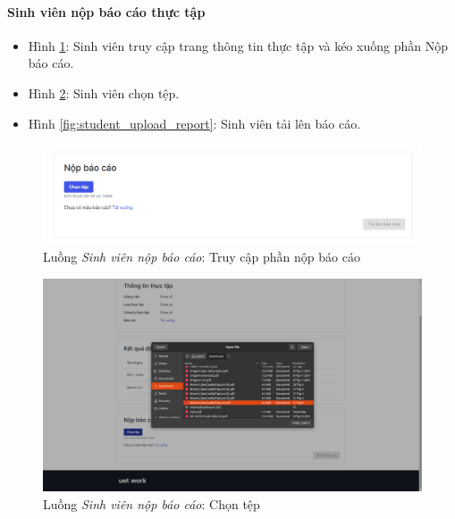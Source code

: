\documentclass[./../main.tex]{subfiles}
\begin{document}
\paragraph*{Sinh viên nộp báo cáo thực tập}

\begin{itemize}
	\item Hình \ref{fig:student_internship_info}: Sinh viên truy cập trang thông tin thực tập và kéo xuống phần Nộp báo cáo.
	\item Hình \ref{fig:student_choose_file}: Sinh viên chọn tệp.
	\item Hình \ref{fig:student_upload_report}: Sinh viên tải lên báo cáo.
\end{itemize}

\begin{figure}[]
	\includegraphics[width=\linewidth]{./images/image41.png}
	\caption{Luồng \emph{Sinh viên nộp báo cáo}: Truy cập phần nộp báo cáo}
	\label{fig:student_internship_info}
\end{figure}

\begin{figure}[]
	\includegraphics[width=\linewidth]{./images/image42.png}
	\caption{Luồng \emph{Sinh viên nộp báo cáo}: Chọn tệp}
	\label{fig:student_choose_file}
\end{figure}
\end{document}

